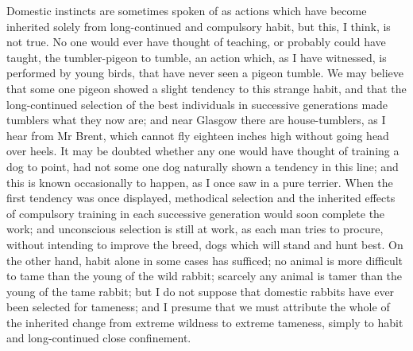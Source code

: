 \indent Domestic instincts are sometimes spoken of as actions which have become inherited solely from long-continued and compulsory habit, but this, I think, is not true. No one would ever have thought of teaching, or probably could have taught, the tumbler-pigeon to tumble, an action which, as I have witnessed, is performed by young birds, that have never seen a pigeon tumble. We may believe that some one pigeon showed a slight tendency to this strange habit, and that the long-continued selection of the best individuals in successive generations made tumblers what they now are; and near Glasgow there are house-tumblers, as I hear from Mr Brent, which cannot fly eighteen inches high without going head over heels. It may be doubted whether any one would have thought of training a dog to point, had not some one dog naturally shown a tendency in this line; and this is known occasionally to happen, as I once saw in a pure terrier. When the first tendency was once displayed, methodical selection and the inherited effects of compulsory training in each successive generation would soon complete the work; and unconscious selection is still at work, as each man tries to procure, without intending to improve the breed, dogs which will stand and hunt best. On the other hand, habit alone in some cases has sufficed; no animal is more difficult to tame than the young of the wild rabbit; scarcely any animal is tamer than the young of the tame rabbit; but I do not suppose that domestic rabbits have ever been selected for tameness; and I presume that we must attribute the whole of the inherited change from extreme wildness to extreme tameness, simply to habit and long-continued close confinement.\\
